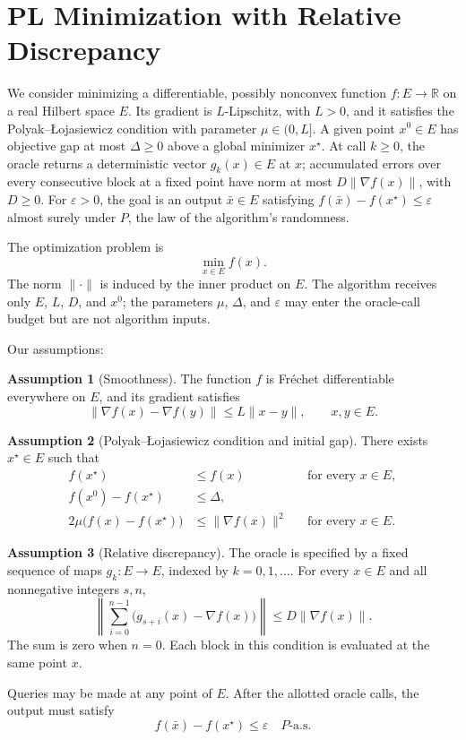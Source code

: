 \documentclass[10pt]{article}
\theoremstyle{definition}
\newtheorem{assumption}{Assumption}
\begin{document}
\section*{PL Minimization with Relative Discrepancy}
We consider minimizing a differentiable, possibly nonconvex function $f:E\to\mathbb{R}$ on a real Hilbert space $E$. Its gradient is $L$-Lipschitz, with $L>0$, and it satisfies the Polyak--\L{}ojasiewicz condition with parameter $\mu\in(0,L]$. A given point $x^0\in E$ has objective gap at most $\Delta\geq0$ above a global minimizer $x^\star$. At call $k\geq0$, the oracle returns a deterministic vector $g_k(x)\in E$ at $x$; accumulated errors over every consecutive block at a fixed point have norm at most $D\|\nabla f(x)\|$, with $D\geq0$. For $\varepsilon>0$, the goal is an output $\bar{x}\in E$ satisfying $f(\bar{x})-f(x^\star)\leq\varepsilon$ almost surely under $P$, the law of the algorithm's randomness.

The optimization problem is
\[
\min_{x\in E} f(x).
\]
The norm $\|\cdot\|$ is induced by the inner product on $E$. The algorithm receives only $E$, $L$, $D$, and $x^0$; the parameters $\mu$, $\Delta$, and $\varepsilon$ may enter the oracle-call budget but are not algorithm inputs.

Our assumptions:
\begin{assumption}[Smoothness]
The function $f$ is Fr\'echet differentiable everywhere on $E$, and its gradient satisfies
\[
\|\nabla f(x)-\nabla f(y)\|\leq L\|x-y\|,
\qquad x,y\in E.
\]
\end{assumption}

\begin{assumption}[Polyak--\L{}ojasiewicz condition and initial gap]
There exists $x^\star\in E$ such that
\[
\begin{aligned}
f(x^\star)&\leq f(x) &&\text{for every }x\in E,\\
f(x^0)-f(x^\star)&\leq\Delta,\\
2\mu\bigl(f(x)-f(x^\star)\bigr)&\leq\|\nabla f(x)\|^2
&&\text{for every }x\in E.
\end{aligned}
\]
\end{assumption}

\begin{assumption}[Relative discrepancy]
The oracle is specified by a fixed sequence of maps $g_k:E\to E$, indexed by $k=0,1,\ldots$. For every $x\in E$ and all nonnegative integers $s,n$,
\[
\left\|\sum_{i=0}^{n-1}
\bigl(g_{s+i}(x)-\nabla f(x)\bigr)\right\|
\leq D\|\nabla f(x)\|.
\]
The sum is zero when $n=0$. Each block in this condition is evaluated at the same point $x$.
\end{assumption}

Queries may be made at any point of $E$. After the allotted oracle calls, the output must satisfy
\[
f(\bar{x})-f(x^\star)\leq\varepsilon
\quad P\text{-a.s.}
\]
\end{document}

